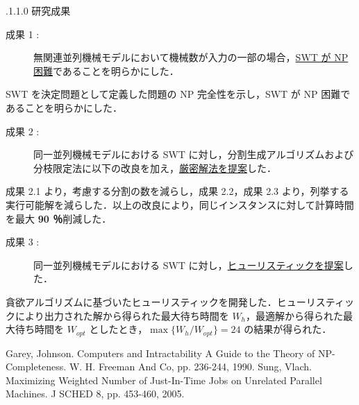 \documentclass[oneside, 10pt, twocolumn]{jarticle}
\makeatletter
\def\section{\@startsection {section}{1}{\z@}{-3.5ex plus -1ex minus
-.2ex}{2.3 ex plus .2ex}{\large\bf}}
\renewcommand{\section}{
\@startsection{section}{1}{\z@}
{.1\Cvs \@plus.0\Cdp \@minus.1\Cdp}%
{.1\Cvs \@plus.1\Cdp \@minus.0\Cdp}%
{\reset@font\large\bfseries}}      %
\makeatother
\begin{document}
\section{研究成果}
\begin{description}
  \item[成果 1 : ]
  無関連並列機械モデルにおいて機械数が入力の一部の場合，\underline{SWT が NP 困難}であることを明らかにした．
\end{description}
SWT を決定問題として定義した問題の NP 完全性を示し，SWT が NP 困難であることを明らかにした．

\begin{description}
  \item[成果 2 : ]
  同一並列機械モデルにおける SWT に対し，分割生成アルゴリズムおよび分枝限定法に以下の改良を加え，\underline{厳密解法を提案}した．
\end{description}
成果 2.1 より，考慮する分割の数を減らし，成果 2.2，成果 2.3 より，列挙する実行可能解を減らした．以上の改良により，同じインスタンスに対して計算時間を最大 {\bf 90 ％}削減した．

\begin{description}
  \item[成果 3 : ]
  同一並列機械モデルにおける SWT に対し，\underline{ヒューリスティックを提案}した．
\end{description}
貪欲アルゴリズムに基づいたヒューリスティックを開発した．ヒューリスティックにより出力された解から得られた最大待ち時間を $W_h$，最適解から得られた最大待ち時間を $W_{opt}$ としたとき，\mbox{\boldmath $\max\big\{W_h/W_{opt}\big\} = 24$} の結果が得られた．

\begin{thebibliography}{9} %
  Garey, Johnson.
  Computers and Intractability A Guide to the Theory of NP-Completeness.
  W. H. Freeman And Co, pp. 236-244, 1990.
  \vspace{-2mm}
  Sung, Vlach.
  Maximizing Weighted Number of Just-In-Time Jobs on Unrelated Parallel Machines. J SCHED 8, pp. 453-460, 2005.
\end{thebibliography}
\end{document}
